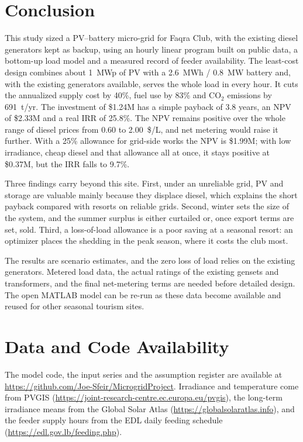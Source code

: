 \section{Conclusion}
\label{sec:conclusion}
This study sized a PV--battery micro-grid for Faqra Club, with the existing diesel generators kept
as backup, using an hourly linear program built on public data, a bottom-up load model and a
measured record of feeder availability. The least-cost design combines about 1~MWp of PV with a
2.6~MWh / 0.8~MW battery and, with the existing generators available, serves the whole load in every hour. It cuts the annualized supply cost
by 40\%, fuel use by 83\% and CO$_2$ emissions by 691~t/yr. The investment of \$1.24M has a simple
payback of 3.8 years, an NPV of \$2.33M and a real IRR of 25.8\%. The NPV remains positive over the
whole range of diesel prices from 0.60 to 2.00~\$/L, and net metering would raise it further. With a 25\%
allowance for grid-side works the NPV is \$1.99M; with low irradiance, cheap diesel and that
allowance all at once, it stays positive at \$0.37M, but the IRR falls to 9.7\%.

Three findings carry beyond this site. First, under an unreliable grid, PV and storage are valuable
mainly because they displace diesel, which explains the short payback compared with resorts on reliable
grids. Second, winter sets the size of the system, and the summer surplus is either curtailed or,
once export terms are set, sold. Third, a loss-of-load allowance is a poor saving at a seasonal
resort: an optimizer places the shedding in the peak season, where it costs the club most.

The results are scenario estimates, and the zero loss of load relies on the existing generators. Metered load data, the actual ratings of the existing gensets and
transformers, and the final net-metering terms are needed before detailed design. The open MATLAB
model can be re-run as these data become available and reused for other seasonal tourism sites.

\section*{Data and Code Availability}
The model code, the input series and the assumption register are available at
\url{https://github.com/Joe-Sfeir/MicrogridProject}. Irradiance and temperature come from PVGIS
(\url{https://joint-research-centre.ec.europa.eu/pvgis}), the long-term irradiance means from the
Global Solar Atlas (\url{https://globalsolaratlas.info}), and the feeder supply hours from the EDL
daily feeding schedule (\url{https://edl.gov.lb/feeding.php}).
